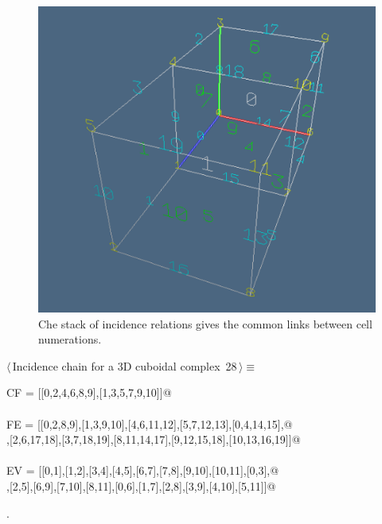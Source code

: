 \documentclass[11pt,oneside]{article}	%
\begin{document}
\begin{figure}[htbp] %
   \centering
   \includegraphics[width=0.5\linewidth]{images/incidenceChain} 
   \caption{Che stack of incidence relations gives the common links between cell numerations.}
   \label{incidenceChain}
\end{figure}


\begin{flushleft} \small \label{scrap46}
\protect{}$\langle\,$Incidence chain for a 3D cuboidal complex\nobreak\ {\footnotesize 28}$\,\rangle\equiv$
\vspace{-1ex}
\begin{list}{}{} \item
\mbox{}\verb@incidence CF = [[0,2,4,6,8,9],[1,3,5,7,9,10]]@\\
\mbox{}\verb@@\\
\mbox{}\verb@incidence FE = [[0,2,8,9],[1,3,9,10],[4,6,11,12],[5,7,12,13],[0,4,14,15],@\\
\mbox{}\verb@[1,5,15,16],[2,6,17,18],[3,7,18,19],[8,11,14,17],[9,12,15,18],[10,13,16,19]]@\\
\mbox{}\verb@@\\
\mbox{}\verb@incidence EV = [[0,1],[1,2],[3,4],[4,5],[6,7],[7,8],[9,10],[10,11],[0,3],@\\
\mbox{}\verb@[1,4],[2,5],[6,9],[7,10],[8,11],[0,6],[1,7],[2,8],[3,9],[4,10],[5,11]]@\\
\mbox{}\verb@@{\NWsep}
\end{list}
\vspace{-1ex}
\footnotesize\addtolength{\baselineskip}{-1ex}
\begin{list}{}{\setlength{\itemsep}{-\parsep}\setlength{\itemindent}{-\leftmargin}}
\item {\NWtxtMacroNoRef}.
\end{list}
\end{flushleft}
\end{document}
